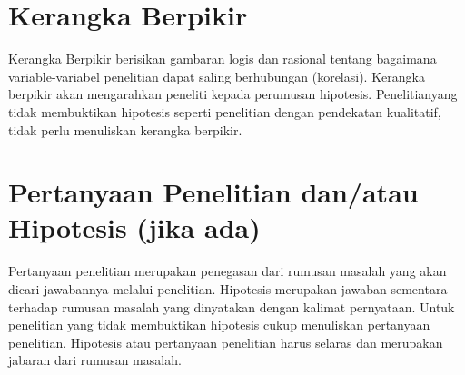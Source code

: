 \section{Kerangka Berpikir}
Kerangka Berpikir berisikan gambaran logis dan rasional tentang bagaimana variable-variabel penelitian dapat saling berhubungan (korelasi). Kerangka berpikir akan mengarahkan peneliti kepada perumusan hipotesis. Penelitianyang tidak membuktikan hipotesis seperti penelitian dengan pendekatan kualitatif, tidak perlu menuliskan kerangka berpikir.

\section{Pertanyaan Penelitian dan/atau Hipotesis (jika ada)}
Pertanyaan penelitian merupakan penegasan dari rumusan masalah yang akan dicari jawabannya melalui penelitian. Hipotesis merupakan jawaban sementara terhadap rumusan masalah yang dinyatakan dengan kalimat pernyataan. Untuk penelitian yang tidak membuktikan hipotesis cukup menuliskan pertanyaan penelitian. Hipotesis atau pertanyaan penelitian harus selaras dan merupakan jabaran dari rumusan masalah.